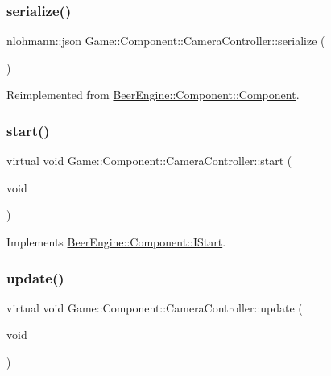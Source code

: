 \subsubsection{\texorpdfstring{serialize()}{serialize()}}
{\footnotesize\ttfamily nlohmann\+::json Game\+::\+Component\+::\+Camera\+Controller\+::serialize (\begin{DoxyParamCaption}{ }\end{DoxyParamCaption})\hspace{0.3cm}{\ttfamily [virtual]}}



Reimplemented from \mbox{\hyperlink{class_beer_engine_1_1_component_1_1_component_a4d82d8a6b22b93514e0585fa4073041f}{Beer\+Engine\+::\+Component\+::\+Component}}.

\mbox{\label{class_game_1_1_component_1_1_camera_controller_afe64421588babbf921d77756fa38a48b}} 
\subsubsection{\texorpdfstring{start()}{start()}}
{\footnotesize\ttfamily virtual void Game\+::\+Component\+::\+Camera\+Controller\+::start (\begin{DoxyParamCaption}\item[{void}]{ }\end{DoxyParamCaption})\hspace{0.3cm}{\ttfamily [virtual]}}



Implements \mbox{\hyperlink{class_beer_engine_1_1_component_1_1_i_start_aa3e25e86e20c46cdaefc6f6d7f21e495}{Beer\+Engine\+::\+Component\+::\+I\+Start}}.

\mbox{\label{class_game_1_1_component_1_1_camera_controller_a675655ee2e18382203f1afa2329a1739}} 
\subsubsection{\texorpdfstring{update()}{update()}}
{\footnotesize\ttfamily virtual void Game\+::\+Component\+::\+Camera\+Controller\+::update (\begin{DoxyParamCaption}\item[{void}]{ }\end{DoxyParamCaption})\hspace{0.3cm}{\ttfamily [virtual]}}



